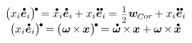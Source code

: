 \begin{otherlanguage}{russian}
\begin{equation*}
\begin{array}{c}
\bigl( x_i \mathdotabove{\bm{e}}_i \bigr)^{ \hspace{-0.15ex} \tikz[baseline=-0.2ex] \draw[black, fill=black] (0,0) circle (.28ex); } \hspace{-0.15ex}
= \mathdotabove{x}_i \mathdotabove{\bm{e}}_i \hspace{-0.1ex} + x_i \mathdotdotabove{\bm{e}}_i \hspace{-0.12ex}
= \hspace{.12ex} \smalldisplaystyleonehalf \hspace{.1ex} \bm{w}_{\hspace{-0.1ex}\raisemath{-0.16ex}{C}\hspace{-0.1ex}or} \hspace{-0.15ex} + x_i \mathdotdotabove{\bm{e}}_i \hspace{-0.1ex}
\\[.2em]
%
\bigl( x_i \mathdotabove{\bm{e}}_i \bigr)^{ \hspace{-0.15ex} \tikz[baseline=-0.2ex] \draw[black, fill=black] (0,0) circle (.28ex); } \hspace{-0.15ex}
= \hspace{-0.15ex} \bigl( \hspace{.1ex} \bm{\omega} \hspace{-0.2ex} \times \hspace{-0.2ex} \bm{x} \hspace{.1ex} \bigr)^{ \hspace{-0.15ex} \tikz[baseline=-0.2ex] \draw[black, fill=black] (0,0) circle (.28ex); } \hspace{-0.15ex}
= \mathdotabove{\bm{\omega}} \hspace{-0.2ex} \times \hspace{-0.2ex} \bm{x} + \bm{\omega} \hspace{-0.2ex} \times \hspace{-0.2ex} \mathdotabove{\bm{x}}
\end{array}
\end{equation*}


\end{otherlanguage}
